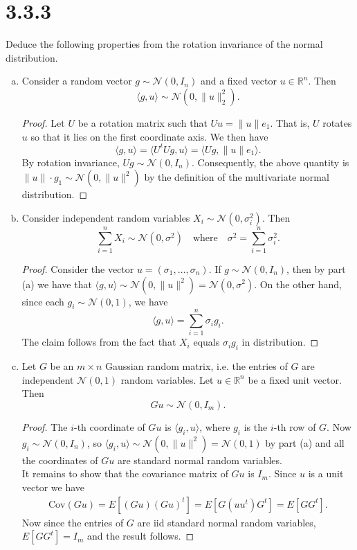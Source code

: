 \documentclass[11pt,letterpaper]{report}
\newcommand{\reals}{\mathbb{R}}
\newcommand{\mcal}[1]{\mathcal{#1}}
\newcommand{\Cov}{\text{Cov}}
\begin{document}
\section*{3.3.3}
Deduce the following properties from the rotation invariance of the normal distribution.
\begin{enumerate}[(a)]
	\item Consider a random vector $g\sim \mcal{N}(0, I_n)$ and a fixed vector $u\in \reals^n$. Then
	\[
	\langle g, u\rangle \sim \mcal{N}(0, \|u\|_2^2).
	\]
	\begin{proof}
		Let $U$ be a rotation matrix such that $Uu = \|u\|e_1$. That is, $U$ rotates $u$ so that it lies on the first coordinate axis. We then have
		\[
		\langle g, u\rangle = \langle U^tUg, u\rangle = \langle Ug, \|u\|e_1\rangle.
		\]
		By rotation invariance, $Ug\sim \mcal{N}(0, I_n)$. Consequently, the above quantity is $\|u\|\cdot g_1 \sim \mcal{N}(0, \|u\|^2)$ by the definition of the multivariate normal distribution.
	\end{proof}

	\item Consider independent random variables $X_i \sim \mcal{N}(0, \sigma_i^2)$. Then
	\[
	\sum_{i=1}^nX_i\sim \mcal{N}(0, \sigma^2)\quad\text{where}\quad\sigma^2 = \sum_{i=1}^n\sigma_i^2.
	\]
	\begin{proof}
		Consider the vector $u = (\sigma_1, \ldots, \sigma_n)$. If $g\sim \mcal{N}(0, I_n)$, then by part (a) we have that $\langle g, u\rangle \sim \mcal{N}(0, \|u\|^2) = \mcal{N}(0, \sigma^2)$. On the other hand, since each $g_i\sim \mcal{N}(0, 1)$, we have
		\[
		\langle g, u\rangle = \sum_{i=1}^n \sigma_ig_i.
		\]
		The claim follows from the fact that $X_i$ equals $\sigma_ig_i$ in distribution.
	\end{proof}

	\item Let $G$ be an $m\times n$ Gaussian random matrix, i.e. the entries of $G$ are independent $\mcal{N}(0, 1)$ random variables. Let $u\in \reals^n$ be a fixed unit vector. Then
	\[
	Gu\sim \mcal{N}(0, I_m).
	\]
	\begin{proof}
		The $i$-th coordinate of $Gu$ is $\langle g_i, u\rangle$, where $g_i$ is the $i$-th row of $G$. Now $g_i\sim \mcal{N}(0, I_n)$, so $\langle g_i, u\rangle \sim \mcal{N}(0, \|u\|^2) = \mcal{N}(0, 1)$ by part (a) and all the coordinates of $Gu$ are standard normal random variables.\\

		It remains to show that the covariance matrix of $Gu$ is $I_m$. Since $u$ is a unit vector we have
		\begin{align*}
			\Cov(Gu) = E[(Gu)(Gu)^t] = E[G(uu^t)G^t] = E[GG^t].
		\end{align*}
		Now since the entries of $G$ are iid standard normal random variables, $E[GG^t] = I_m$ and the result follows.
	\end{proof}
\end{enumerate}
\end{document}
